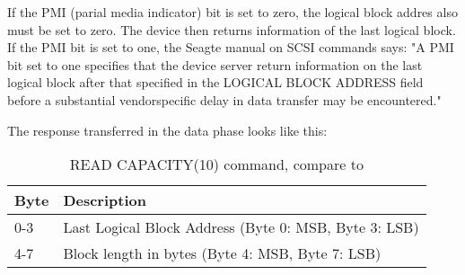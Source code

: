 If the PMI (parial media indicator) bit is set to zero, the logical block addres also must be set to zero. The device then returns information of the last logical block. If the PMI bit is set to one, the Seagte manual on SCSI commands says: "A PMI bit set to one specifies that the device server return information on the last logical block after that specified in the LOGICAL BLOCK ADDRESS field before a substantial vendorspecific delay in data transfer may be encountered."\cite{scsi_seagate}

The response transferred in the data phase looks like this:

\begin{table}[ht]
\caption{READ CAPACITY(10) command, compare to \cite{usb_ms_jan, scsi_seagate}}
\centering
\begin{tabular}{|l|l|}
\hline\hline
\textbf{Byte} & \textbf{Description}\\ \hline
0-3 & Last Logical Block Address (Byte 0: MSB, Byte 3: LSB)\\ \hline
4-7 & Block length in bytes (Byte 4: MSB, Byte 7: LSB) \\ \hline
\end{tabular}
\label{table:read_capacity_response}
\end{table}
